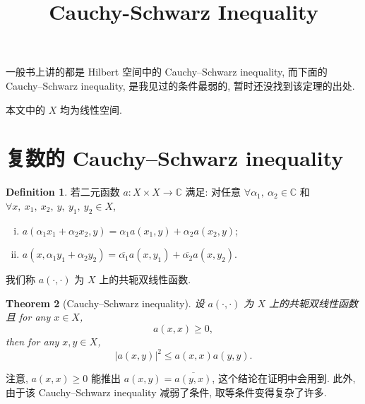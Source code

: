 \documentclass[a4paper,12pt]{article}
\title{Cauchy-Schwarz Inequality}
\newtheorem{theorem}{Theorem}[section]
\theoremstyle{definition}
\newtheorem{definition}[theorem]{Definition}
\begin{document}
\maketitle

一般书上讲的都是 Hilbert 空间中的 Cauchy–Schwarz inequality, 
而下面的 Cauchy–Schwarz inequality, 是我见过的条件最弱的, 暂时还没找到该定理的出处.

本文中的 $ X $ 均为线性空间.

\section{复数的 Cauchy–Schwarz inequality}

\begin{definition}
    若二元函数 $ a: X \times X \to \mathbb{C} $ 满足: 
    对任意 $ \forall \alpha_1,\ \alpha_2 \in \mathbb{C} $ 和 $ \forall x,\ x_1,\ x_2,\ y,\ y_1,\ y_2 \in X $,
    \begin{enumerate}[(i)]
        \item $ a(\alpha_1 x_1 + \alpha_2 x_2, y) = \alpha_1 a(x_1, y) + \alpha_2 a(x_2, y) $;
        \item $ a(x, \alpha_1 y_1 + \alpha_2 y_2) = \overline{\alpha_1} a(x, y_1) + \overline{\alpha_2} a(x, y_2) $.
    \end{enumerate}
    我们称 $ a(\cdot, \cdot) $ 为 $ X $ 上的共轭双线性函数.
\end{definition}

\begin{theorem}[Cauchy–Schwarz inequality]
    设 $ a(\cdot, \cdot) $ 为 $ X $ 上的共轭双线性函数且 for any $ x \in X $,
    $$
        a(x, x) \geq 0,
    $$
    then for any $  x, y \in X $,
    \begin{equation} \label{result}
        |a(x, y)|^2 \leq a(x, x) a(y, y).
    \end{equation}
\end{theorem}

注意, $ a(x, x) \geq 0 $ 能推出 $ a(x, y) = \overline{a(y, x)} $, 这个结论在证明中会用到.
此外, 由于该 Cauchy–Schwarz inequality 减弱了条件, 取等条件变得复杂了许多.
\end{document}
